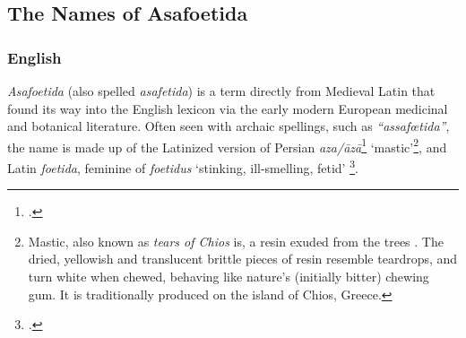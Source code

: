 \subsection{The Names of Asafoetida}

\subsubsection{English}



\textit{Asafoetida} (also spelled \textit{asafetida}) is a term directly from Medieval Latin that found its way into the English lexicon via the early modern European medicinal and botanical literature. Often seen with archaic spellings, such as \textit{``assafœtida''}, the name is made up of the Latinized version of Persian  \textit{aza/āzā}\footcite[][p. 42, \url{https://dsal.uchicago.edu/cgi-bin/app/steingass_query.py?page=42}]{steingass_comprehensive_1892} `mastic'\footnote{Mastic, also known as \textit{tears of Chios} is, a resin exuded from the trees . The dried, yellowish and translucent brittle pieces of resin resemble teardrops, and turn white when chewed, behaving like nature's (initially bitter) chewing gum. It is traditionally produced on the island of Chios, Greece.}, and Latin \textit{foetida}, feminine of \textit{foetidus} `stinking, ill-smelling, fetid' \footcite[asafoetida]{oed}. 

